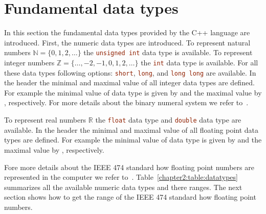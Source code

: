 \section{Fundamental data types}
\label{sec:fundamental:types}
In this section the fundamental data types provided by the C++ language are introduced. First, the numeric data types are introduced. To represent natural numbers $\mathbb{N}=\{0,1,2,\ldots \}$ the \lstinline[language=C++]|unsigned int| data type is available. To represent integer numbers $\mathbb{Z}=\{\ldots,-2,-1,0,1,2,\ldots \}$ the \lstinline[language=C++]|int| data type is available. For all these data types following options: \lstinline[language=C++]|short|, \lstinline[language=C++]|long|, and \lstinline[language=C++]|long long| are available. In the  header the minimal and maximal value of all integer data types are defined. For example the minimal value of  data type is given by  and the maximal value by , respectively. For more details about the binary numeral system we refer to~\cite{gilli1965binary}. 

To represent real numbers $\mathbb{R}$ the \lstinline[language=C++]|float| data type and \lstinline[language=C++]|double| data type are available. In the  header the minimal and maximal value of all floating point data types are defined. For example the minimal value of  data type is given by  and the maximal value by , respectively. 

Fore more details about the IEEE 474 standard how floating point numbers are represented in the computer we refer to~\cite{4610935,goldberg1991every}. Table~\ref{chapter2:table:datatypes} summarizes all the available numeric data types and there ranges. The next section shows how to get the range of the IEEE 474 standard how floating point numbers.


